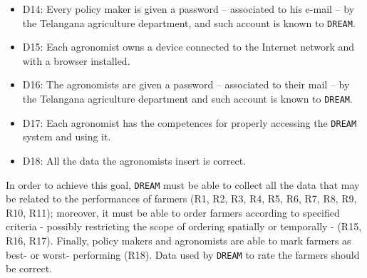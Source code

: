 \documentclass{article}
\begin{document}
\begin{itemize}
    \item D14: Every policy maker is given a password – associated to his e-mail – by the Telangana agriculture department, and such account is known to \verb|DREAM|.
  
    \item D15: Each agronomist owns a device connected to the Internet network and with a browser installed.
  
    \item D16: The agronomists are given a password – associated to their mail – by the Telangana agriculture department and such account is known to \verb|DREAM|.
  
    \item D17: Each agronomist has the competences for properly accessing the \verb|DREAM| system and using it.
   
    \item D18: All the data the agronomists insert is correct.
  
\end{itemize}

In order to achieve this goal, \verb|DREAM| must be able to collect all the data that may be related to the performances of farmers (R1, R2, R3, R4, R5, R6, R7, R8, R9, R10, R11); moreover, it must be able to order farmers according to specified criteria - possibly restricting the scope of ordering spatially or temporally - (R15, R16, R17). Finally, policy makers and agronomists are able to mark farmers as best- or worst- performing (R18).
Data used by \verb|DREAM| to rate the farmers should be correct.
\newline
\end{document}

